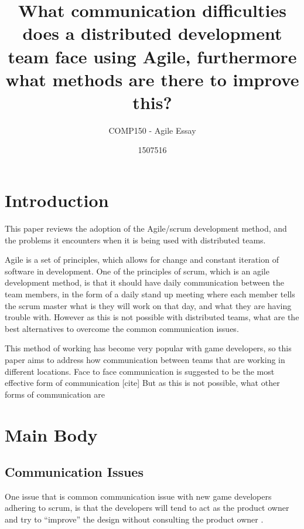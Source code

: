 \documentclass{scrartcl}
\title{What communication difficulties does a distributed development team face using Agile, furthermore what methods are there to improve this?}
\subtitle{COMP150 - Agile Essay}
\author{1507516}
\begin{document}
\maketitle


\section{Introduction}

This paper reviews the adoption of the Agile/scrum development method, and the problems it encounters when it is being used with distributed teams.

Agile is a set of principles, which allows for change and constant iteration of software in development. One of the principles of scrum, which is an agile development method, is that it should have daily communication between the team members\cite{abdullah2011}, in the form of a daily stand up meeting where each member tells the scrum master what is they will work on that day, and what they are having trouble with. However as this is not possible with distributed teams, what are the best alternatives to overcome the common communication issues.

This method of working has become very popular with game developers, so this paper aims to address how communication between teams that are working in different locations. 
Face to face communication is suggested to be the most effective form of communication [cite] But as this is not possible, what other forms of communication are 


\section{Main Body}

\subsection{Communication Issues}

One issue that is common communication issue with new game developers adhering to scrum, is that the developers will tend to act as the product owner and try to ``improve'' the design without consulting the product owner \cite{krasteva2008}. 
\end{document}

